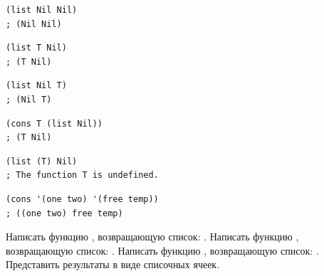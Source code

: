 \documentclass[a4paper]{report}
\begin{document}
\begin{task}
\begin{AutoMultiColEnumerate}
		\item
\begin{lstlisting}[style=lispinline]
(list Nil Nil)
; (Nil Nil)
\end{lstlisting}

		\item
\begin{lstlisting}[style=lispinline]
(list T Nil)
; (T Nil)
\end{lstlisting}

		\item
\begin{lstlisting}[style=lispinline]
(list Nil T)
; (Nil T)
\end{lstlisting}

		\item
\begin{lstlisting}[style=lispinline]
(cons T (list Nil))
; (T Nil)
\end{lstlisting}

		\item
\begin{lstlisting}[style=lispinline]
(list (T) Nil)
; The function T is undefined.
\end{lstlisting}

		\item
\begin{lstlisting}[style=lispinline]
(cons '(one two) '(free temp))
; ((one two) free temp)
\end{lstlisting}

	\end{AutoMultiColEnumerate}
\end{task}

\begin{task}
	Написать функцию , возвращающую список: .
	Написать функцию , возвращающую список: .
	Написать функцию , возвращающую список: .
	Представить результаты в виде списочных ячеек.
\end{task}
\end{document}
